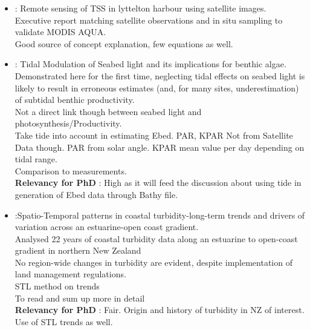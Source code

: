 \documentclass[]{report}
\begin{document}
		\begin{itemize}
		
		\item \cite{pinkerton2014remote} : Remote sensing of TSS in lyttelton harbour using satellite images.
		\\ Executive report matching satellite observations and in situ sampling to validate MODIS AQUA.
		\\ Good source of concept explanation, few equations as well.
		
			
		\item \cite{roberts2018tidal} : Tidal Modulation of Seabed light and its implications for benthic algae.
		\\ Demonstrated here for the first time, neglecting tidal effects on seabed light is likely to result in erroneous estimates (and, for many sites, underestimation) of subtidal benthic productivity.
		\\ Not a direct link though between seabed light and photosynthesis/Productivity.
		\\ Take tide into account in estimating Ebed. PAR, KPAR Not from Satellite Data though. PAR from solar angle. KPAR mean value per day depending on tidal range.
		\\ Comparison to measurements. 
		\\\textbf{Relevancy for PhD} : High as it will feed the discussion about using tide in generation of Ebed data through Bathy file.
		
		\item \cite{seers2015spatio} :Spatio-Temporal patterns in coastal turbidity-long-term trends and drivers of variation across an estuarine-open coast gradient.
		\\Analysed 22 years of coastal turbidity data along an estuarine to open-coast gradient in northern New Zealand
		\\ No region-wide changes in turbidity are evident, despite implementation of land management regulations.
		\\STL method on trends
		\\To read and sum up more in detail
		\\\textbf{Relevancy for PhD} : Fair. Origin and history of turbidity in NZ of interest. Use of STL trends as well.
		

\end{itemize}
\end{document}
